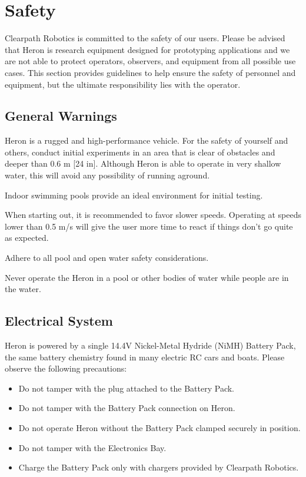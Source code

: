 \documentclass[]{clearpath-latex/clearpath-manual}
\begin{document}
\section{Safety}
Clearpath Robotics is committed to the safety of our users. Please be advised that Heron is research equipment designed for prototyping applications and we are not able to protect operators, observers, and equipment from all possible use cases. This section provides guidelines to help ensure the safety of personnel and equipment, but the ultimate responsibility lies with the operator.

\subsection{General Warnings}
Heron is a rugged and high-performance vehicle. For the safety of yourself and others, conduct initial experiments in an area that is clear of obstacles and deeper than 0.6 m [24 in]. Although Heron is able to operate in very shallow water, this will avoid any possibility of running aground.

Indoor swimming pools provide an ideal environment for initial testing.

When starting out, it is recommended to favor slower speeds. Operating at speeds lower than 0.5 m/s will give the user more time to react if things don’t go quite as expected.

Adhere to all pool and open water safety considerations.

\begin{warning}
Never operate the Heron in a pool or other bodies of water while people are in the water.
\end{warning}

\subsection{Electrical System}
Heron is powered by a single 14.4V Nickel-Metal Hydride (NiMH) Battery Pack, the same battery chemistry found in many electric RC cars and boats. Please observe the following precautions:

\begin{itemize}[nolistsep]
	\item Do not tamper with the plug attached to the Battery Pack.
	\item Do not tamper with the Battery Pack connection on Heron.
	\item Do not operate Heron without the Battery Pack clamped securely in position.
	\item Do not tamper with the Electronics Bay.
	\item Charge the Battery Pack only with chargers provided by Clearpath Robotics.
\end{itemize}
\end{document}

